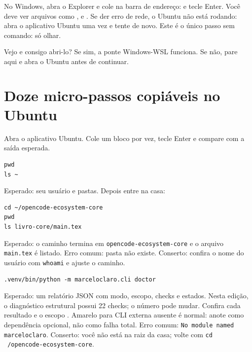 \begin{metodo}
No Windows, abra o Explorer e cole na barra de endereço:  e tecle Enter. Você deve ver arquivos como ,  e . Se der erro de rede, o Ubuntu não está rodando: abra o aplicativo Ubuntu uma vez e tente de novo. Este é o único passo sem comando: só olhar.
\end{metodo}

\begin{checkpoint}
Vejo  e consigo abri-lo? Se sim, a ponte Windows-WSL funciona. Se não, pare aqui e abra o Ubuntu antes de continuar.
\end{checkpoint}

\section{Doze micro-passos copiáveis no Ubuntu}


\begin{metodo}
Abra o aplicativo Ubuntu. Cole um bloco por vez, tecle Enter e compare com a saída esperada.
\begin{verbatim}
pwd
ls ~
\end{verbatim}
Esperado: seu usuário e pastas. Depois entre na casa:
\begin{verbatim}
cd ~/opencode-ecosystem-core
pwd
ls livro-core/main.tex
\end{verbatim}
Esperado: o caminho termina em \texttt{opencode-ecosystem-core} e o arquivo \texttt{main.tex} é listado. Erro comum: pasta não existe. Conserto: confira o nome do usuário com \texttt{whoami} e ajuste o caminho.
\end{metodo}


\begin{metodo}
\begin{verbatim}
.venv/bin/python -m marceloclaro.cli doctor
\end{verbatim}
Esperado: um relatório JSON com modo, escopo, checks e estados. Nesta edição, o diagnóstico estrutural possui 22 checks; o número pode mudar. Confira cada resultado e o escopo . Amarelo para CLI externa ausente é normal: anote como dependência opcional, não como falha total. Erro comum: \texttt{No module named marceloclaro}. Conserto: você não está na raiz da casa; volte com \texttt{cd ~/opencode-ecosystem-core}.
\end{metodo}

